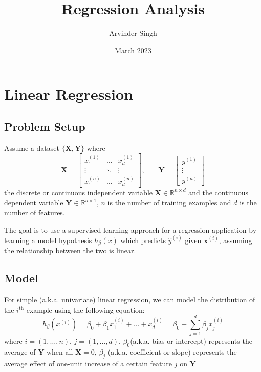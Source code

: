 \documentclass{report}
\title{Regression Analysis}
\author{Arvinder Singh}
\date{March 2023}
\begin{document}
\maketitle
\tableofcontents

\chapter{Linear Regression}
\section{Problem Setup}
Assume a dataset \(\{\mathbf{X}, \mathbf{Y}\}\) where
\[
	\mathbf{X} = \begin{bmatrix}
    x^{(1)}_1 & \dots & x^{(1)}_d \\
    \vdots & \ddots & \vdots \\
    x^{(n)}_1 & \dots & x^{(n)}_d
	\end{bmatrix}
	\text{,}\qquad
	\mathbf{Y} = \begin{bmatrix}
    y^{(1)}\\
    \vdots\\
    y^{(n)}
	\end{bmatrix}
\]
the discrete or continuous independent variable \(\mathbf{X} \in \mathbb{R}^{n\times d}\) 
and the continuous dependent variable \(\mathbf{Y} \in \mathbb{R}^{n\times 1}\),
\(n\) is the number of training examples and \(d\) is the number of features.

The goal is to use a supervised learning approach for a regression application by learning a model hypothesis \(h_\beta(x)\) which predicts \(\hat y^{(i)}\) given \(\mathbf{x}^{(i)}\), assuming the relationship between the two is linear.

\section{Model}
For simple (a.k.a. univariate) linear regression, we can model the distribution of the \(i^\text{th}\) example using the following equation:
\[
	\boxed{h_\beta(x^{(i)}) = \beta_0 + \beta_1 x_1^{(i)} + \dots +  x_d^{(i)} = \beta_0 + \sum_{j=1}^d\beta_j  x_j^{(i)}}
\]
where \(i = (1,\dots,n)\), \(j = (1,\dots,d)\), \(\beta_0\)(a.k.a. bias or intercept) represents the average of \(\mathbf{Y}\) when all \(\mathbf{X} = 0\), \(\beta_j\) (a.k.a. coefficient or slope) represents the average effect of one-unit increase of a certain feature \(j\) on \(\mathbf{Y}\)
\end{document}
